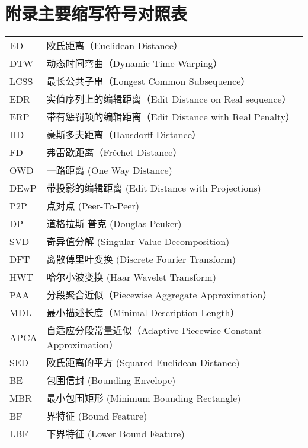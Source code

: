 \newpage
\chapter*{附录\quad 主要缩写符号对照表}
\vskip 5mm

\begin{tabular}{p{}p{}}
	ED  &  欧氏距离（Euclidean Distance）  \\
	DTW  & 动态时间弯曲（Dynamic Time Warping）  \\
	LCSS  & 最长公共子串（Longest Common Subsequence）  \\
	EDR  & 实值序列上的编辑距离（Edit Distance on Real sequence）  \\
	ERP  & 带有惩罚项的编辑距离（Edit Distance with  Real Penalty）  \\
	HD & 豪斯多夫距离（Hausdorff Distance）  \\
	FD  & 弗雷歇距离（Fréchet Distance）  \\
	OWD  & 一路距离 (One Way Distance)  \\
	DEwP  & 带投影的编辑距离 (Edit Distance with   Projections)  \\
	P2P  & 点对点 (Peer-To-Peer) \\
	DP  & 道格拉斯-普克 (Douglas-Peuker)  \\
	SVD & 奇异值分解 (Singular Value Decomposition)  \\
	DFT  & 离散傅里叶变换 (Discrete Fourier Transform) \\
	HWT & 哈尔小波变换 (Haar Wavelet Transform)  \\
	PAA & 分段聚合近似（Piecewise Aggregate Approximation）  \\
	MDL & 最小描述长度（Minimal Description Length）\\
	APCA & 自适应分段常量近似（Adaptive Piecewise Constant Approximation）\\
	SED & 欧氏距离的平方 (Squared Euclidean Distance)\\
	BE & 包围信封 (Bounding Envelope)\\
	MBR & 最小包围矩形 (Minimum Bounding Rectangle)\\
	BF& 界特征 (Bound Feature)\\
	LBF& 下界特征 (Lower Bound Feature)\\
\end{tabular}

\clearpage
\phantom{s}
\clearpage

